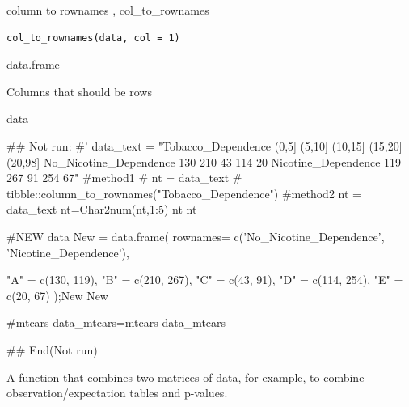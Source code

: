 \documentclass[a4paper]{book}
\begin{document}
%
\begin{Description}
column to rownames , col\_to\_rownames
\end{Description}
%
\begin{Usage}
\begin{verbatim}
col_to_rownames(data, col = 1)
\end{verbatim}
\end{Usage}
%
\begin{Arguments}
\begin{ldescription}
\item[\code{data}] data.frame

\item[\code{col}] Columns that should be rows
\end{ldescription}
\end{Arguments}
%
\begin{Value}
data
\end{Value}
%
\begin{Examples}
\begin{ExampleCode}

## Not run: 
#'
data_text = "Tobacco_Dependence (0,5] (5,10] (10,15] (15,20] (20,98]
No_Nicotine_Dependence 130 210 43 114 20
Nicotine_Dependence 119 267 91 254 67"
#method1
# nt = data_text%
#         tibble::column_to_rownames("Tobacco_Dependence")
#method2
nt = data_text%
nt=Char2num(nt,1:5)
nt
nt %

#NEW data
New = data.frame(
  rownames= c('No_Nicotine_Dependence', 'Nicotine_Dependence'),

  "A" = c(130, 119),
  "B" = c(210, 267),
  "C" = c(43, 91),
  "D" = c(114, 254),
  "E" = c(20, 67)
);New
New%

#mtcars
data_mtcars=mtcars%
data_mtcars%




## End(Not run)


\end{ExampleCode}
\end{Examples}
%
\begin{Description}
A function that combines two matrices of data, for example, to combine observation/expectation tables and p-values.
\end{Description}
\end{document}
